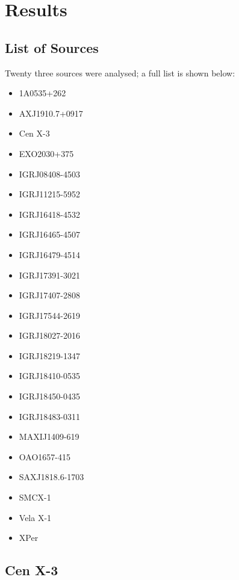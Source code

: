 
\chapter{Results} %

\label{ch:results} %

\section{List of Sources}
Twenty three sources were analysed; a full list is shown below:
\begin{itemize}
\item 1A0535+262
\item AXJ1910.7+0917
\item Cen X-3
\item EXO2030+375
\item IGRJ08408-4503
\item IGRJ11215-5952
\item IGRJ16418-4532
\item IGRJ16465-4507
\item IGRJ16479-4514
\item IGRJ17391-3021
\item IGRJ17407-2808
\item IGRJ17544-2619
\item IGRJ18027-2016
\item IGRJ18219-1347
\item IGRJ18410-0535
\item IGRJ18450-0435
\item IGRJ18483-0311
\item MAXIJ1409-619
\item OAO1657-415
\item SAXJ1818.6-1703
\item SMCX-1
\item Vela X-1
\item XPer
\end{itemize}
\clearpage{}

\section{Cen X-3}


